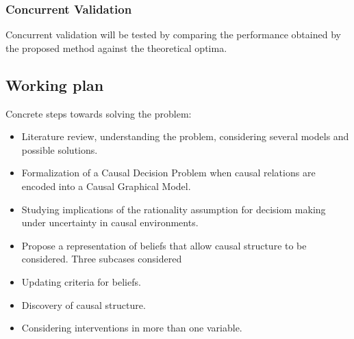 \documentclass[english,letterpaper,12pt,final]{article}
\theoremstyle{definition}
\begin{document}
\subsubsection{Concurrent Validation}
Concurrent validation will be tested by comparing the performance obtained by the proposed method against the theoretical optima.
\subsection{Working plan}
Concrete steps towards solving the problem:
\begin{itemize}
\item Literature review, understanding the problem, considering several models and possible solutions.
\item Formalization of a Causal Decision Problem when causal relations are encoded into a Causal Graphical Model.
\item Studying implications of the rationality assumption for decisiom making under uncertainty in causal environments.
\item Propose a representation of beliefs that allow causal structure to be considered. Three subcases considered
\item Updating criteria for beliefs.
\item Discovery of causal structure.
\item Considering interventions in more than one variable.

\end{itemize}
\end{document}
